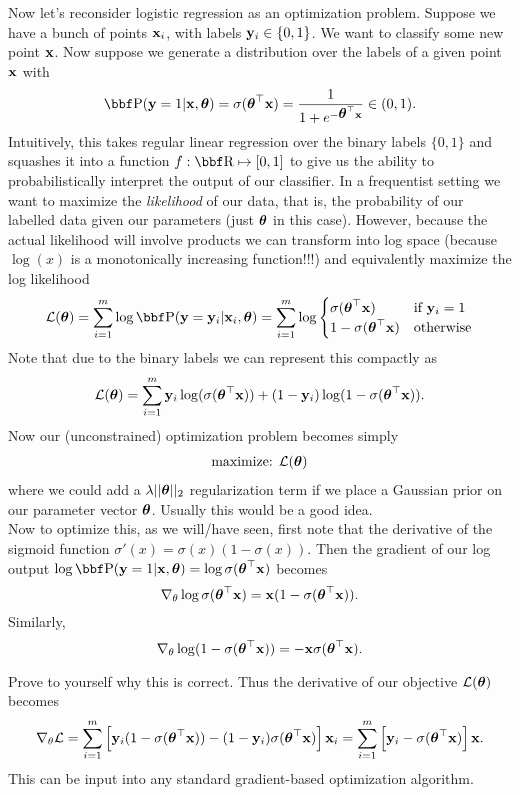 \documentclass{article}
\begin{document}
Now let's reconsider logistic regression as an optimization problem.
Suppose we have a bunch of points ${\bf x}_i$, with labels ${\bf y}_i \in \{0,1\}$.
We want to classify some new point ${\bf x}$.
Now suppose we generate a distribution over the labels of a given point
${\bf x}$ with
\[
    \PP(\yy = 1 | \xx,\thetab) = \sigma(\thetab^\T\xx) = \frac{1}{1 + e^{-\thetab^\T\xx}} \in (0,1).
\]
Intuitively, this takes regular linear regression over the binary labels
$\{0,1\}$ and squashes it into a function $f : \RR \mapsto [0,1]$ to give
us the ability to probabilistically interpret the output of our classifier.
In a frequentist setting we want to maximize the \textit{likelihood} of our data,
that is, the probability of our labelled data given our parameters (just
$\hbox{\boldmath$\theta$}$ in this case). However, because the actual likelihood will involve
products we can transform into log space (because $\log(x)$ is a monotonically
increasing function!!!) and equivalently maximize the log likelihood
\[
    \Lc(\thetab) = \sum_{i=1}^m \log \PP(\yy=\yy_i | \xx_i, \thetab) = \sum_{i=1}^m \log \begin{cases}
        \sigma(\thetab^\T\xx) & \text{if $\yy_i=1$}\\
        1-\sigma(\thetab^\T\xx) & \text{otherwise}
    \end{cases}
\]
Note that due to the binary labels we can represent this compactly as
\[
    {\cal L}(\hbox{\boldmath$\theta$}) = \sum_{i=1}^m {\bf y}_i\log(\sigma(\hbox{\boldmath$\theta$}^\top{\bf x})) + (1-{\bf y}_i)\log(1-\sigma(\hbox{\boldmath$\theta$}^\top{\bf x})).
\]
Now our (unconstrained) optimization problem becomes simply
\begin{align*}
    \text{maximize: } {\cal L}(\hbox{\boldmath$\theta$})
\end{align*}
where we could add a $\lambda ||\hbox{\boldmath$\theta$}||_2$ regularization term if we place
a Gaussian prior on our parameter vector $\hbox{\boldmath$\theta$}$. Usually this would be a
good idea.\\

Now to optimize this, as we will/have seen, first note that the derivative of
the sigmoid function $\sigma'(x) = \sigma(x)\left(1-\sigma(x)\right)$. Then the
gradient of our log output $\log\PP(\yy=1|\xx,\thetab) = \log\sigma(\thetab^\T\xx)$
becomes
\[
    \nabla_\theta \log\sigma(\hbox{\boldmath$\theta$}^\top{\bf x}) = {\bf x}(1-\sigma(\hbox{\boldmath$\theta$}^\top{\bf x}) ).
\]
Similarly,
\[
    \nabla_\theta \log(1-\sigma(\hbox{\boldmath$\theta$}^\top{\bf x})) = -{\bf x}\sigma(\hbox{\boldmath$\theta$}^\top{\bf x}).
\]

Prove to yourself why this is correct. Thus the derivative of our objective ${\cal L}(\hbox{\boldmath$\theta$})$
becomes
\[
    \nabla_\theta {\cal L} = \sum_{i=1}^m \left[  {\bf y}_i(1-\sigma(\hbox{\boldmath$\theta$}^\top{\bf x})) - (1-{\bf y}_i)\sigma(\hbox{\boldmath$\theta$}^\top{\bf x})  \right]{\bf x}_i = \sum_{i=1}^m \left[ {\bf y}_i - \sigma(\hbox{\boldmath$\theta$}^\top{\bf x}) \right]{\bf x}.
\]
This can be input into any standard gradient-based optimization algorithm.
\end{document}
